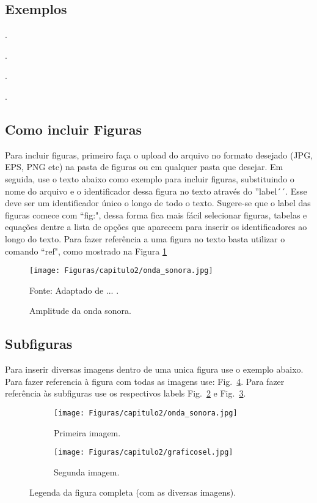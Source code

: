 \subsection{Exemplos}

\lipsum[2] \cite{infraero}.

\lipsum[2] \cite{BAYER2009}

\lipsum[2] \cite{googleearth}.

\lipsum[2] \cite{OMS2011}.

\lipsum[2] \cite{NBR12859}.

\subsection{Como incluir Figuras}

Para incluir figuras, primeiro faça o upload do arquivo no formato desejado (JPG, EPS, PNG etc) na pasta de figuras ou em qualquer pasta que desejar. Em seguida, use o texto abaixo como exemplo para incluir figuras, substituindo o nome do arquivo e o identificador dessa figura no texto através do ''label´´. Esse deve ser um identificador único o longo de todo o texto. Sugere-se que o label das figuras comece com ``fig:", dessa forma fica mais fácil selecionar figuras, tabelas e equações dentre a lista de opções que aparecem para inserir os identificadores ao longo do texto.
Para fazer referência a uma figura no texto basta utilizar o comando ``ref", como mostrado na Figura \ref{fig:conceitos-da-onda}
\begin{figure}[H]
	\centering
	\texttt{[image: Figuras/capitulo2/onda\_sonora.jpg]}
	\caption{Amplitude da onda sonora.}
	Fonte: Adaptado de ... .
    \label{fig:conceitos-da-onda}
\end{figure}

\subsection{Subfiguras}

Para inserir diversas imagens dentro de uma unica figura use o exemplo abaixo. 
Para fazer referencia à figura com todas as imagens use: Fig.~\ref{fig:exemplos-de-subfiguras}. Para fazer referência às subfiguras use os respectivos labels Fig.~\ref{fig:exemplo-subfig1} e Fig.~\ref{fig:exemplo-subfig2}.

\begin{figure}[H]
    \centering
    \begin{subfigure}{\textwidth}
       \centering
       \texttt{[image: Figuras/capitulo2/onda\_sonora.jpg]}
       \caption{Primeira imagem.}
       \label{fig:exemplo-subfig1}
    \end{subfigure}
    \begin{subfigure}{\textwidth}
       \centering
       \texttt{[image: Figuras/capitulo2/graficosel.jpg]}
       \caption{Segunda imagem.}
       \label{fig:exemplo-subfig2}
    \end{subfigure}
  \caption{Legenda da figura completa (com as diversas imagens).}
  \label{fig:exemplos-de-subfiguras}
\end{figure}

